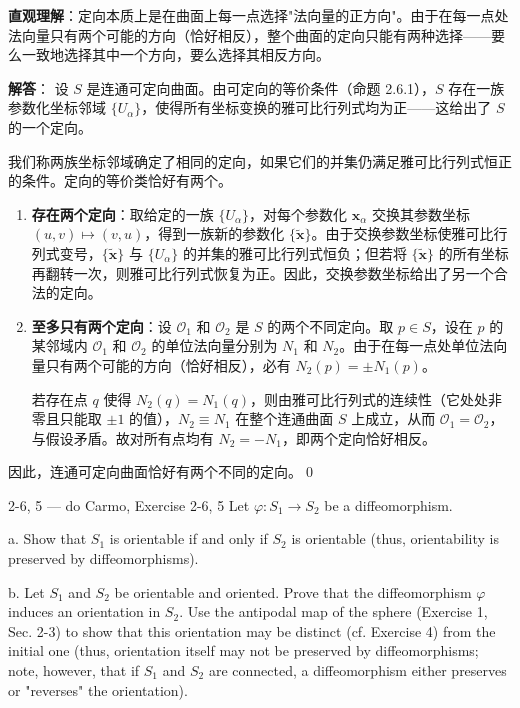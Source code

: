 \begin{solution}
\textbf{直观理解}：定向本质上是在曲面上每一点选择"法向量的正方向"。由于在每一点处法向量只有两个可能的方向（恰好相反），整个曲面的定向只能有两种选择——要么一致地选择其中一个方向，要么选择其相反方向。

\textbf{解答}：
设 $S$ 是连通可定向曲面。由可定向的等价条件（命题 2.6.1），$S$ 存在一族参数化坐标邻域 $\{U_\alpha\}$，使得所有坐标变换的雅可比行列式均为正——这给出了 $S$ 的一个定向。

我们称两族坐标邻域确定了相同的定向，如果它们的并集仍满足雅可比行列式恒正的条件。定向的等价类恰好有两个。

\begin{enumerate}
    \item \textbf{存在两个定向}：取给定的一族 $\{U_\alpha\}$，对每个参数化 $\mathbf{x}_\alpha$ 交换其参数坐标 $(u, v) \mapsto (v, u)$，得到一族新的参数化 $\{\tilde{\mathbf{x}}\}$。由于交换参数坐标使雅可比行列式变号，$\{\tilde{\mathbf{x}}\}$ 与 $\{U_\alpha\}$ 的并集的雅可比行列式恒负；但若将 $\{\tilde{\mathbf{x}}\}$ 的所有坐标再翻转一次，则雅可比行列式恢复为正。因此，交换参数坐标给出了另一个合法的定向。

    \item \textbf{至多只有两个定向}：设 $\mathcal{O}_1$ 和 $\mathcal{O}_2$ 是 $S$ 的两个不同定向。取 $p \in S$，设在 $p$ 的某邻域内 $\mathcal{O}_1$ 和 $\mathcal{O}_2$ 的单位法向量分别为 $N_1$ 和 $N_2$。由于在每一点处单位法向量只有两个可能的方向（恰好相反），必有 $N_2(p) = \pm N_1(p)$。

    若存在点 $q$ 使得 $N_2(q) = N_1(q)$，则由雅可比行列式的连续性（它处处非零且只能取 $\pm 1$ 的值），$N_2 \equiv N_1$ 在整个连通曲面 $S$ 上成立，从而 $\mathcal{O}_1 = \mathcal{O}_2$，与假设矛盾。故对所有点均有 $N_2 = -N_1$，即两个定向恰好相反。
\end{enumerate}
因此，连通可定向曲面恰好有两个不同的定向。\qed
\end{solution}

\begin{exercise}{2-6, 5 — do Carmo, Exercise 2-6, 5}
Let $\varphi: S_1 \to S_2$ be a diffeomorphism.

a. Show that $S_1$ is orientable if and only if $S_2$ is orientable (thus, orientability is preserved by diffeomorphisms).

b. Let $S_1$ and $S_2$ be orientable and oriented. Prove that the diffeomorphism $\varphi$ induces an orientation in $S_2$. Use the antipodal map of the sphere (Exercise 1, Sec. 2-3) to show that this orientation may be distinct (cf. Exercise 4) from the initial one (thus, orientation itself may not be preserved by diffeomorphisms; note, however, that if $S_1$ and $S_2$ are connected, a diffeomorphism either preserves or "reverses" the orientation).
\end{exercise}

